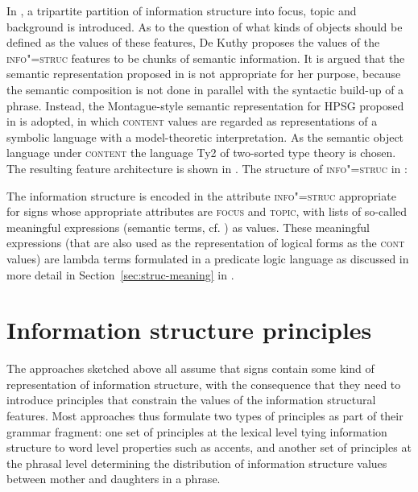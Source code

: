 \documentclass[output=paper,biblatex,babelshorthands,newtxmath,draftmode,colorlinks,citecolor=brown]{langscibook}
\begin{document}
In , a tripartite partition of information
structure into focus, topic and background is introduced. As to the
question of what kinds of objects should be defined as the values of
these features, De Kuthy proposes the values of the
\textsc{info"=struc} features to be chunks of semantic information.  It
is argued that the semantic representation proposed in  is
not appropriate for her purpose, because the semantic composition is
not done in parallel with the syntactic build-up of a phrase. Instead,
the Montague-style \citep[cf.\ ][]{DWP81a-u} semantic representation for HPSG proposed in
 is adopted, in which \textsc{content} values are
regarded as representations of a symbolic language with a
model-theoretic interpretation. As the semantic object language under
\textsc{content} the language Ty2 \citep[cf.\ ][]{Gallin75a-u} of
two-sorted type theory is chosen. The resulting feature architecture
is shown in .
\ea
The structure of \textsc{info"=struc} in :\\
\leavevmode
{}
    \label{fig:info-struc}
\z

\largerpage[-1]
\noindent
The information structure is encoded in the attribute
\textsc{info"=struc} appropriate for signs whose appropriate
attributes are \textsc{focus} and \textsc{topic}, with lists of
so-called meaningful expressions (semantic terms, cf.
\citealt{Sailer2000a}) as values. These meaningful expressions (that
are also used as the representation of logical forms as the
\textsc{cont} values) are lambda terms formulated in a predicate logic
language as discussed in more detail in
Section~\ref{sec:struc-meaning} in .

\section{Information structure principles}
\label{sec:inf-principles}

The approaches sketched above all assume that signs contain some kind
of representation of information structure, with the
consequence that they need to introduce principles that constrain the
values of the information structural features. Most approaches thus
formulate two types of principles as part of their grammar fragment:
one set of principles at the lexical level tying information structure to word
level properties such as accents, and another set of principles at the
phrasal level determining the distribution of information structure
values between mother and daughters in a phrase.
\end{document}
